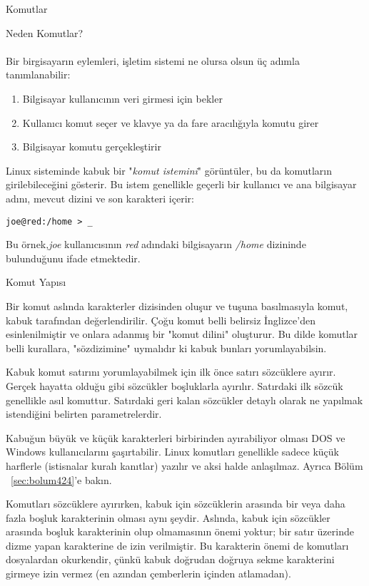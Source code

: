 \begin{section}{Komutlar}
\begin{subsection}{Neden Komutlar?}
\paragraph{}{Bir birgisayarın eylemleri, işletim sistemi ne olursa olsun üç adımla tanımlanabilir:
\begin{enumerate}
 \item Bilgisayar kullanıcının veri girmesi için bekler
 \item Kullanıcı komut seçer ve klavye ya da fare aracılığıyla komutu girer
 \item Bilgisayar komutu gerçekleştirir
\end{enumerate}}

Linux sisteminde kabuk bir "\emph{komut istemini}" görüntüler, bu da komutların girilebileceğini gösterir. Bu istem genellikle geçerli bir kullanıcı ve ana bilgisayar adını, mevcut dizini ve son karakteri içerir:
\footnotesize
\begin{verbatim}joe@red:/home > _
\end{verbatim}
 \normalsize 
Bu örnek,\emph{joe} kullanıcısının \emph{red} adındaki bilgisayarın \emph{/home} dizininde bulunduğunu ifade etmektedir.
\end{subsection}
\begin{subsection}{Komut Yapısı}

Bir komut aslında karakterler dizisinden oluşur ve \Return tuşuna basılmasıyla komut, kabuk tarafından değerlendirilir. Çoğu komut belli belirsiz İnglizce'den esinlenilmiştir ve onlara adanmış bir "komut dilini" oluşturur. Bu dilde komutlar belli kurallara, "sözdizimine" uymalıdır ki kabuk bunları yorumlayabilsin.

Kabuk komut satırını yorumlayabilmek için ilk önce satırı sözcüklere ayırır. Gerçek hayatta olduğu gibi sözcükler boşluklarla ayırılır. Satırdaki ilk sözcük genellikle asıl komuttur. Satırdaki geri kalan sözcükler detaylı olarak ne yapılmak istendiğini belirten parametrelerdir.

Kabuğun büyük ve küçük karakterleri birbirinden ayırabiliyor olması DOS ve Windows kullanıcılarını şaşırtabilir. Linux komutları genellikle sadece küçük harflerle (istisnalar kuralı kanıtlar) yazılır ve aksi halde anlaşılmaz. Ayrıca Bölüm ~\ref{sec:bolum424}'e bakın.

Komutları sözcüklere ayırırken, kabuk için sözcüklerin arasında bir veya daha fazla boşluk karakterinin olması aynı şeydir. Aslında, kabuk için sözcükler arasında boşluk karakterinin olup olmamasının önemi yoktur; bir satır üzerinde dizme yapan karakterine de izin verilmiştir. Bu karakterin önemi de komutları dosyalardan okurkendir, çünkü kabuk doğrudan doğruya sekme karakterini girmeye izin vermez (en azından çemberlerin içinden atlamadan).


\end{subsection}
\end{section}
